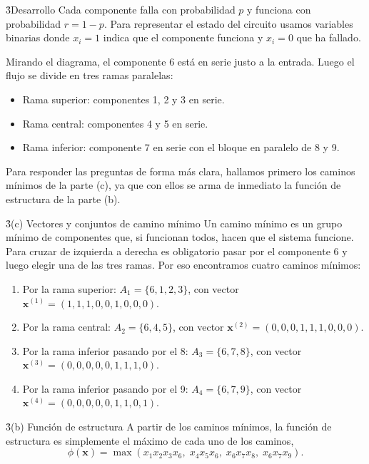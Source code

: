 \documentclass[main.tex]{subfiles}%
\begin{document}
\vspace{3mm}
\h3{Desarrollo}
Cada componente falla con probabilidad $p$ y funciona con probabilidad $r = 1 - p$. Para representar el estado del circuito usamos variables binarias donde $x_i = 1$ indica que el componente funciona y $x_i = 0$ que ha fallado.

Mirando el diagrama, el componente 6 está en serie justo a la entrada. Luego el flujo se divide en tres ramas paralelas:
\begin{itemize}
    \item Rama superior: componentes 1, 2 y 3 en serie.
    \item Rama central: componentes 4 y 5 en serie.
    \item Rama inferior: componente 7 en serie con el bloque en paralelo de 8 y 9.
\end{itemize}

Para responder las preguntas de forma más clara, hallamos primero los caminos mínimos de la parte (c), ya que con ellos se arma de inmediato la función de estructura de la parte (b).

\vspace{3mm}
\h3{(c) Vectores y conjuntos de camino mínimo}
Un camino mínimo es un grupo mínimo de componentes que, si funcionan todos, hacen que el sistema funcione. Para cruzar de izquierda a derecha es obligatorio pasar por el componente 6 y luego elegir una de las tres ramas. Por eso encontramos cuatro caminos mínimos:

\begin{enumerate}
    \item Por la rama superior: $A_1 = \{6, 1, 2, 3\}$, con vector $\mathbf{x}^{(1)} = (1, 1, 1, 0, 0, 1, 0, 0, 0)$.
    \item Por la rama central: $A_2 = \{6, 4, 5\}$, con vector $\mathbf{x}^{(2)} = (0, 0, 0, 1, 1, 1, 0, 0, 0)$.
    \item Por la rama inferior pasando por el 8: $A_3 = \{6, 7, 8\}$, con vector $\mathbf{x}^{(3)} = (0, 0, 0, 0, 0, 1, 1, 1, 0)$.
    \item Por la rama inferior pasando por el 9: $A_4 = \{6, 7, 9\}$, con vector $\mathbf{x}^{(4)} = (0, 0, 0, 0, 0, 1, 1, 0, 1)$.
\end{enumerate}

\vspace{3mm}
\h3{(b) Función de estructura}
A partir de los caminos mínimos, la función de estructura es simplemente el máximo de cada uno de los caminos,
\begin{equation*}
    \phi(\mathbf{x}) = \max(x_1 x_2 x_3 x_6, \; x_4 x_5 x_6, \; x_6 x_7 x_8, \; x_6 x_7 x_9).
\end{equation*}
\end{document}
